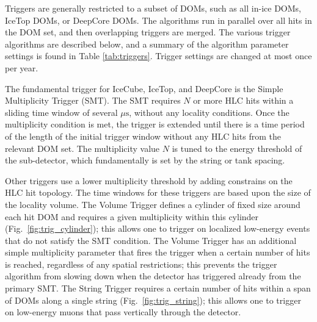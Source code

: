 Triggers are generally restricted to a subset of DOMs, such as all in-ice DOMs,
IceTop DOMs, or DeepCore DOMs.  The algorithms run in parallel over all
hits in the DOM set, and then overlapping triggers are merged.  The various
trigger algorithms are described below, and a summary of the algorithm
parameter settings is found in Table \ref{tab:triggers}.  Trigger settings
are changed at most once per year.

The fundamental trigger for IceCube, IceTop, and DeepCore is the Simple
Multiplicity Trigger (SMT).  The SMT requires $N$ or more HLC hits within a
sliding time window of several $\mu\mathrm{s}$, without any locality
conditions.  Once the multiplicity condition is met, the trigger is 
extended until there is a time period of the length of the initial trigger
window without any HLC hits from the relevant DOM set.  The
multiplicity value $N$ is tuned to the energy threshold of the sub-detector,
which fundamentally is set by the string or tank spacing.

Other triggers use a lower multiplicity threshold by adding constrains on
the HLC hit topology.  The time windows for these triggers are based upon
the size of the locality volume. The Volume Trigger defines a cylinder of fixed size around
each hit DOM and requires a given multiplicity within this cylinder
(Fig.~\ref{fig:trig_cylinder}); this allows one to trigger on localized
low-energy events that do not satisfy the SMT condition.  The Volume Trigger
has an additional simple multiplicity parameter that fires the trigger when
a certain number of hits is reached, regardless of any spatial
restrictions; this prevents the trigger 
algorithm from slowing down when the detector has triggered already from
the primary SMT. The String Trigger requires a certain number of hits
within a span of DOMs along a single string 
(Fig.~\ref{fig:trig_string}); this allows one to trigger on low-energy
muons that pass vertically through the detector.

